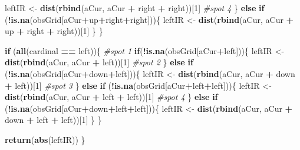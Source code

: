 \documentclass[]{article}
\newenvironment{Shaded}{\begin{snugshade}}{\end{snugshade}}
\newcommand{\CommentTok}[1]{\textcolor[rgb]{0.56,0.35,0.01}{\textit{#1}}}
\newcommand{\ControlFlowTok}[1]{\textcolor[rgb]{0.13,0.29,0.53}{\textbf{#1}}}
\newcommand{\DecValTok}[1]{\textcolor[rgb]{0.00,0.00,0.81}{#1}}
\newcommand{\KeywordTok}[1]{\textcolor[rgb]{0.13,0.29,0.53}{\textbf{#1}}}
\newcommand{\NormalTok}[1]{#1}
\newcommand{\OperatorTok}[1]{\textcolor[rgb]{0.81,0.36,0.00}{\textbf{#1}}}
\newcommand{\StringTok}[1]{\textcolor[rgb]{0.31,0.60,0.02}{#1}}
\begin{document}
\begin{Shaded}
\begin{Highlighting}[]
\NormalTok{    leftIR <-}\StringTok{ }\KeywordTok{dist}\NormalTok{(}\KeywordTok{rbind}\NormalTok{(aCur, aCur }\OperatorTok{+}\StringTok{ }\NormalTok{right }\OperatorTok{+}\StringTok{ }\NormalTok{right))[}\DecValTok{1}\NormalTok{]}
    \CommentTok{#spot 4}
\NormalTok{    \} }\ControlFlowTok{else} \ControlFlowTok{if}\NormalTok{ (}\OperatorTok{!}\KeywordTok{is.na}\NormalTok{(obsGrid[aCur}\OperatorTok{+}\NormalTok{up}\OperatorTok{+}\NormalTok{right}\OperatorTok{+}\NormalTok{right]))\{}
\NormalTok{      leftIR <-}\StringTok{ }\KeywordTok{dist}\NormalTok{(}\KeywordTok{rbind}\NormalTok{(aCur, aCur }\OperatorTok{+}\StringTok{ }\NormalTok{up }\OperatorTok{+}\StringTok{ }\NormalTok{right }\OperatorTok{+}\StringTok{ }\NormalTok{right))[}\DecValTok{1}\NormalTok{]}
\NormalTok{    \}}
\NormalTok{  \}}

     \ControlFlowTok{if}\NormalTok{ (}\KeywordTok{all}\NormalTok{(cardinal }\OperatorTok{==}\StringTok{ }\NormalTok{left))\{}
    \CommentTok{#spot 1}
    \ControlFlowTok{if}\NormalTok{(}\OperatorTok{!}\KeywordTok{is.na}\NormalTok{(obsGrid[aCur}\OperatorTok{+}\NormalTok{left]))\{}
\NormalTok{        leftIR <-}\StringTok{ }\KeywordTok{dist}\NormalTok{(}\KeywordTok{rbind}\NormalTok{(aCur, aCur }\OperatorTok{+}\StringTok{ }\NormalTok{left))[}\DecValTok{1}\NormalTok{]}
         \CommentTok{#spot 2}
\NormalTok{    \} }\ControlFlowTok{else} \ControlFlowTok{if}\NormalTok{ (}\OperatorTok{!}\KeywordTok{is.na}\NormalTok{(obsGrid[aCur}\OperatorTok{+}\NormalTok{down}\OperatorTok{+}\NormalTok{left]))\{}
\NormalTok{       leftIR <-}\StringTok{ }\KeywordTok{dist}\NormalTok{(}\KeywordTok{rbind}\NormalTok{(aCur, aCur }\OperatorTok{+}\StringTok{ }\NormalTok{down }\OperatorTok{+}\StringTok{ }\NormalTok{left))[}\DecValTok{1}\NormalTok{]}
       \CommentTok{#spot 3}
\NormalTok{    \} }\ControlFlowTok{else} \ControlFlowTok{if}\NormalTok{ (}\OperatorTok{!}\KeywordTok{is.na}\NormalTok{(obsGrid[aCur}\OperatorTok{+}\NormalTok{left}\OperatorTok{+}\NormalTok{left]))\{}
\NormalTok{   leftIR <-}\StringTok{ }\KeywordTok{dist}\NormalTok{(}\KeywordTok{rbind}\NormalTok{(aCur, aCur }\OperatorTok{+}\StringTok{ }\NormalTok{left }\OperatorTok{+}\StringTok{ }\NormalTok{left))[}\DecValTok{1}\NormalTok{]}
    \CommentTok{#spot 4}
\NormalTok{    \} }\ControlFlowTok{else} \ControlFlowTok{if}\NormalTok{ (}\OperatorTok{!}\KeywordTok{is.na}\NormalTok{(obsGrid[aCur}\OperatorTok{+}\NormalTok{down}\OperatorTok{+}\NormalTok{left}\OperatorTok{+}\NormalTok{left]))\{}
\NormalTok{      leftIR <-}\StringTok{ }\KeywordTok{dist}\NormalTok{(}\KeywordTok{rbind}\NormalTok{(aCur, aCur }\OperatorTok{+}\StringTok{ }\NormalTok{down }\OperatorTok{+}\StringTok{ }\NormalTok{left }\OperatorTok{+}\StringTok{ }\NormalTok{left))[}\DecValTok{1}\NormalTok{]}
\NormalTok{    \}}
\NormalTok{  \}   }
 
  \KeywordTok{return}\NormalTok{(}\KeywordTok{abs}\NormalTok{(leftIR))}
\NormalTok{\}}
\end{Highlighting}
\end{Shaded}
\end{document}

